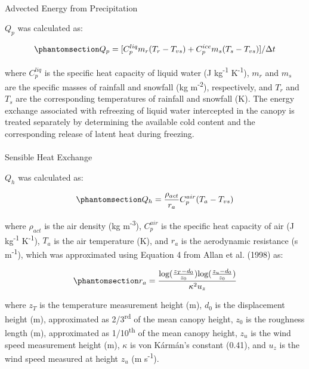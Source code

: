 \documentclass[
  letterpaper,
]{tex/uofsthesis-cs}
\makeatletter
\let\oldparagraph\paragraph
\renewcommand{\paragraph}{
    \@ifstar
      \xxxParagraphStar
      \xxxParagraphNoStar
  }
\newcommand{\xxxParagraphStar}[1]{\oldparagraph*{#1}\mbox{}}
\newcommand{\xxxParagraphNoStar}[1]{\oldparagraph{#1}\mbox{}}
\makeatother
\begin{document}
\paragraph{Advected Energy from
Precipitation}\label{advected-energy-from-precipitation}

\(Q_p\) was calculated as:

\begin{equation}\phantomsection\label{eq-qp-05}{
Q_p = [C_p^{liq} m_r(T_r - T_{vs}) + C_p^{ice} m_s(T_s - T_{vs})] / \Delta t
}\end{equation}

where \(C_p^{liq}\) is the specific heat capacity of liquid water (J
kg\textsuperscript{-1} K\textsuperscript{-1}), \(m_r\) and \(m_s\) are
the specific masses of rainfall and snowfall (kg m\textsuperscript{-2}),
respectively, and \(T_r\) and \(T_s\) are the corresponding temperatures
of rainfall and snowfall (K). The energy exchange associated with
refreezing of liquid water intercepted in the canopy is treated
separately by determining the available cold content and the
corresponding release of latent heat during freezing.

\paragraph{Sensible Heat Exchange}\label{sensible-heat-exchange}

\(Q_h\) was calculated as:

\begin{equation}\phantomsection\label{eq-qh-05}{
Q_h = \frac{\rho_{act}}{r_a} C_p^{air} (T_a - T_{vs})
}\end{equation}

where \(\rho_{act}\) is the air density (kg m\textsuperscript{-3}),
\(C_p^{air}\) is the specific heat capacity of air (J
kg\textsuperscript{-1} K\textsuperscript{-1}), \(T_a\) is the air
temperature (K), and \(r_a\) is the aerodynamic resistance (s
m\textsuperscript{-1}), which was approximated using Equation 4 from
Allan et al. (1998) as:

\begin{equation}\phantomsection\label{eq-ra-05}{
r_a = \frac{\text{log}(\frac{z_T - d_0}{z_0})\text{log}(\frac{z_u - d_0}{z_0})}{\kappa^2 u_z}
}\end{equation}

where \(z_T\) is the temperature measurement height (m), \(d_0\) is the
displacement height (m), approximated as 2/3\textsuperscript{rd} of the
mean canopy height, \(z_0\) is the roughness length (m), approximated as
1/10\textsuperscript{th} of the mean canopy height, \(z_u\) is the wind
speed measurement height (m), \(\kappa\) is von Kármán's constant
(0.41), and \(u_z\) is the wind speed measured at height \(z_u\) (m
s\textsuperscript{-1}).
\end{document}
